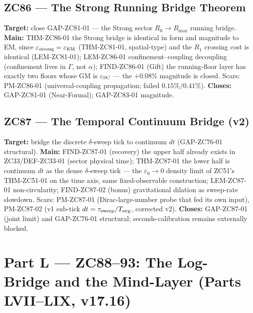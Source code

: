 \documentclass[11pt, a4paper]{article}
\begin{document}
\subsection{ZC86 --- The Strong Running Bridge Theorem}

\begin{zcbox}[title={ZC86: THM-ZC86-01 --- Strong Running Bridge
  (Near-Formal) + FIND-ZC86-01 (Gift)}]
\sloppy
\textbf{Target:} close GAP-ZC81-01 --- the Strong sector
$R_0\to R_{\max}$ running bridge.
\textbf{Main:} THM-ZC86-01 the Strong bridge is identical in form and
magnitude to EM, since $\varepsilon_{\rm strong}=\varepsilon_{\rm EM}$
(THM-ZC81-01, spatial-type) and the $R_1$ crossing cost is identical
(LEM-ZC81-01); LEM-ZC86-01 confinement--coupling decoupling
(confinement lives in $\Gamma$, not $\alpha$); FIND-ZC86-01 (Gift) the
running-floor layer has exactly two floors whose GM is
$\varepsilon_{\rm SC}$ --- the $+0.08\%$ magnitude is closed. Scars:
PM-ZC86-01 (universal-coupling propagation; failed $0.15\%/0.41\%$).
\textbf{Closes:} GAP-ZC81-01 (Near-Formal); GAP-ZC83-01 magnitude.
\end{zcbox}

\subsection{ZC87 --- The Temporal Continuum Bridge (v2)}

\begin{zcbox}[title={ZC87: THM-ZC87-01 --- Temporal Continuum Bridge
  (Near-Formal, v2)}]
\sloppy
\textbf{Target:} bridge the discrete $\delta$-sweep tick to continuum
$dt$ (GAP-ZC76-01 structural).
\textbf{Main:} FIND-ZC87-01 (recovery) the upper half already exists in
ZC33/DEF-ZC33-01 (sector physical time); THM-ZC87-01 the lower half is
continuum $dt$ as the dense $\delta$-sweep tick --- the
$\varepsilon_0\!\to\!0$ density limit of ZC51's THM-ZC51-01 on the time
axis, same fixed-observable construction; LEM-ZC87-01 non-circularity;
FIND-ZC87-02 (bonus) gravitational dilation as sweep-rate slowdown.
Scars: PM-ZC87-01 (Dirac-large-number probe that fed its own input),
PM-ZC87-02 (v1 sub-tick $dt=\tau_{\rm sweep}/T_{\rm avg}$, corrected v2).
\textbf{Closes:} GAP-ZC87-01 (joint limit) and GAP-ZC76-01 structural;
seconds-calibration remains externally blocked.
\end{zcbox}

\newpage
\section{Part L --- ZC88--93: The Log-Bridge and the Mind-Layer
  (Parts LVII--LIX, v17.16)}
\end{document}
